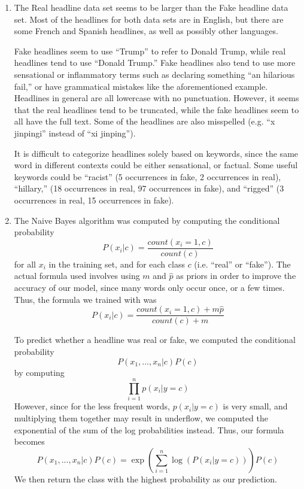 \documentclass[10pt,letterpaper]{article}
\begin{document}
	\begin{enumerate}
		\item %
		The Real headline data set seems to be larger than the Fake headline data set.
		Most of the headlines for both data sets are in English, but there are some French and Spanish headlines, as well as possibly other languages.

		Fake headlines seem to use ``Trump'' to refer to Donald Trump, while real headlines tend to use ``Donald Trump.''
		Fake headlines also tend to use more sensational or inflammatory terms such as declaring something ``an hilarious fail,'' or have grammatical mistakes like the aforementioned example.
		Headlines in general are all lowercase with no punctuation.
		However, it seems that the real headlines tend to be truncated, while the fake headlines seem to all have the full text.
		Some of the headlines are also misspelled (e.g. ``x jinpingi'' instead of ``xi jinping'').

		It is difficult to categorize headlines solely based on keywords, since the same word in different contexts could be either sensational, or factual.
		Some useful keywords could be ``racist'' (5 occurrences in fake, 2 occurrences in real), ``hillary,'' (18 occurrences in real, 97 occurrences in fake), and ``rigged'' (3 occurrences in real, 15 occurrences in fake).

		\item %
		The Naive Bayes algorithm was computed by computing the conditional probability 
		\[
			P(x_i | c) =  \frac{count(x_i = 1, c)}{count(c)}
		\]
		for all $x_i$ in the training set, and for each class $c$ (i.e. ``real'' or ``fake'').
		The actual formula used involves using $m$ and $\hat{p}$ as priors in order to improve the accuracy of our model, since many words only occur once, or a few times.
		Thus, the formula we trained with was
		\[
			P(x_i | c) =  \frac{count(x_i = 1, c) + m\hat{p}}{count(c) + m}
		\]
		
		To predict whether a headline was real or fake, we computed the conditional probability
		\[P(x_1, ..., x_n | c) P(c)\]
		by computing 
		\[\prod_{i = 1}^{n}p(x_i|y=c)\]
		However, since for the less frequent words, $p(x_i|y=c)$ is very small, and multiplying them together may result in underflow, we computed the exponential of the sum of the log probabilities instead.
		Thus, our formula becomes 
		\[
			P(x_1, ..., x_n | c) P(c) = \exp\left(\sum_{i = 1}^{n}\log(P(x_i|y=c))\right)P(c)
		\]
		We then return the class with the highest probability as our prediction.
		

\end{enumerate}
\end{document}
